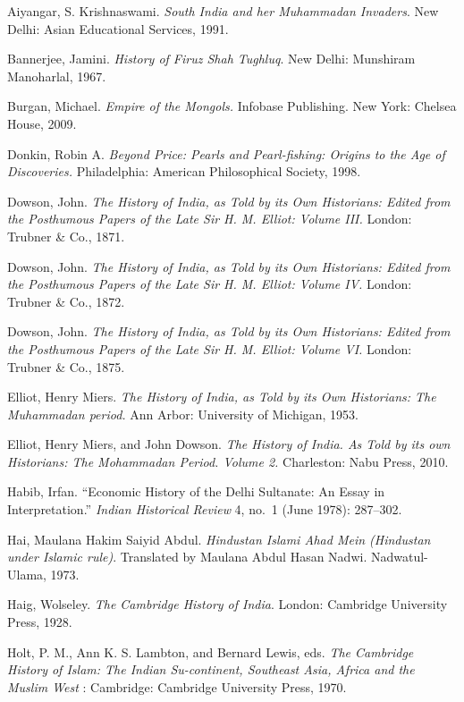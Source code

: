 \begin{thebibliography}{99}
\itemsep=1.1pt
 Aiyangar, S. Krishnaswami.  \textit{South India and her Muhammadan Invaders}. New Delhi: Asian Educational Services, 1991. 

 Bannerjee, Jamini. \textit{History of Firuz Shah Tughluq}. New Delhi: Munshiram Manoharlal, 1967. 

 Burgan, Michael. \textit{ Empire of the Mongols.} Infobase Publishing. New York: Chelsea House, 2009. 

 Donkin, Robin A. \textit{Beyond Price: Pearls and Pearl-fishing: Origins to the Age of Discoveries.} Philadelphia: American Philosophical Society, 1998.

 Dowson, John. \textit{The History of India, as Told by its Own Historians: Edited from the Posthumous Papers of the Late Sir H. M. Elliot: Volume III.} London: Trubner \& Co., 1871.

 Dowson, John. \textit{The History of India, as Told by its Own Historians: Edited from the Posthumous Papers of the Late Sir H. M. Elliot: Volume IV.} London: Trubner \& Co., 1872.

 Dowson, John. \textit{The History of India, as Told by its Own Historians: Edited from the Posthumous Papers of the Late Sir H. M. Elliot: Volume VI.} London: Trubner \& Co., 1875.

 Elliot, Henry Miers. \textit{The History of India, as Told by its Own Historians: The Muhammadan period.} Ann Arbor: University of Michigan, 1953.

 Elliot, Henry Miers, and John Dowson. \textit{The History of India. As Told by its own Historians: The Mohammadan Period. Volume 2.} Charleston: Nabu Press, 2010.

 Habib, Irfan. “Economic History of the Delhi Sultanate: An Essay in Interpretation.” \textit{Indian Historical Review} 4, no.\ 1 (June 1978): 287--302.

 Hai, Maulana Hakim Saiyid Abdul. \textit{Hindustan Islami Ahad Mein (Hindustan under Islamic rule)}. Translated by Maulana Abdul Hasan Nadwi. Nadwatul-Ulama, 1973.

 Haig, Wolseley. \textit{The Cambridge History of India}. London: Cambridge University Press, 1928. 

 Holt, P. M., Ann K. S. Lambton, and Bernard Lewis, eds. \textit{The Cambridge History of Islam: The Indian Su-continent, Southeast Asia, Africa and the Muslim West} : Cambridge: Cambridge University Press, 1970. 


\end{thebibliography}
